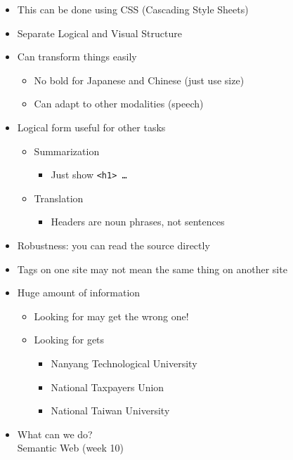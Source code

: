 \documentclass[a4paper,landscape,headrule,footrule,xetex]{foils}
\begin{document}
\begin{itemize}\addtolength{\itemsep}{-1ex}
\item This can be done using CSS (Cascading Style Sheets)
\item Separate Logical and Visual Structure
\end{itemize}


\begin{itemize}
\item Can transform things easily
  \begin{itemize}
  \item No bold for Japanese and Chinese (just use size)
  \item Can adapt to other modalities (speech)
  \end{itemize}
\item Logical form useful for other tasks
  \begin{itemize}
  \item Summarization
    \begin{itemize}
    \item  Just show \texttt{<h1> \ldots\ <h3>}
    \end{itemize}
  \item Translation
    \begin{itemize}
    \item Headers are noun phrases, not sentences
    \end{itemize}
  \end{itemize}
\item Robustness: you can read the source directly
\end{itemize}



\begin{itemize}
\item Tags on one site may not mean the same thing on another site
\item Huge amount of information
  \begin{itemize}
  \item Looking for  may get the wrong one!
  \item Looking for  gets
    \begin{itemize}
    \item Nanyang Technological University
    \item National Taxpayers Union
    \item National Taiwan University
    \end{itemize}
  \end{itemize}
\item What can we do?
\\ Semantic Web (week 10)
\end{itemize}
\end{document}
